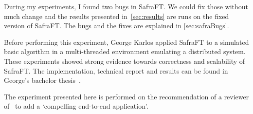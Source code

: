 During my experiments, I found two bugs in SafraFT.
We could fix those without much change and the results presented in~\cref{sec:results} are runs on the fixed version of SafraFT.
The bugs and the fixes are explained in \cref{sec:safraBugs}.

Before performing this experiment, George Karlos applied SafraFT to a simulated basic algorithm in a multi-threaded environment emulating a distributed system.
These experiments showed strong evidence towards correctness and scalability of SafraFT.
The implementation, technical report and results can be found in George's bachelor thesis~\cite{karlos}.

The experiment presented here is performed on the recommendation of a reviewer of~\cite{safraFT2018} to add a `compelling end-to-end application'.
